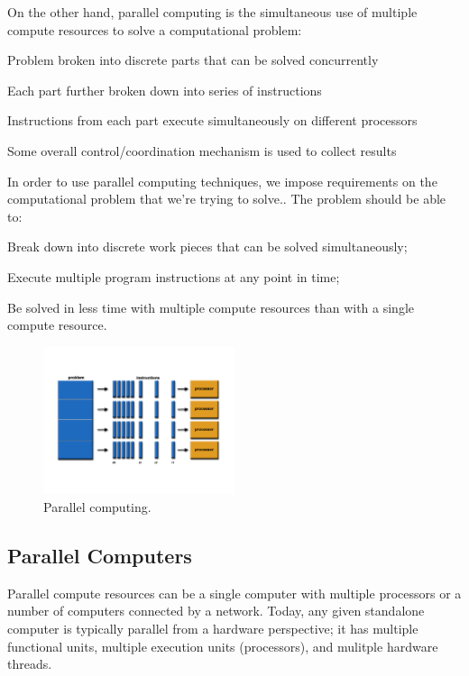 \documentclass[12pt]{article}
\begin{document}
On the other hand, parallel computing is the simultaneous use of multiple
compute resources to solve a computational problem:

\begin{compactitem}
\item Problem broken into discrete parts that can be solved concurrently
\item Each part further broken down into series of instructions
\item Instructions from each part execute simultaneously on different
      processors
\item Some overall control/coordination mechanism is used to collect results
\end{compactitem}

In order to use parallel computing techniques, we impose requirements on the
computational problem that we're trying to solve.. The problem should be able to:

\begin{compactitem}
\item Break down into discrete work pieces that can be solved simultaneously;
\item Execute multiple program instructions at any point in time;
\item Be solved in less time with multiple compute resources than with a single
      compute resource.
\end{compactitem}

\begin{figure}[!htb]
\centering
\includegraphics[width=0.5\textwidth]{parallel-problem.pdf}
\caption{Parallel computing.}
\end{figure}

\FloatBarrier
\subsection*{Parallel Computers}

Parallel compute resources can be a single computer with multiple processors or
a number of computers connected by a network. Today, any given standalone
computer is typically parallel from a hardware perspective; it has multiple
functional units, multiple execution units (processors), and mulitple hardware
threads.
\end{document}
